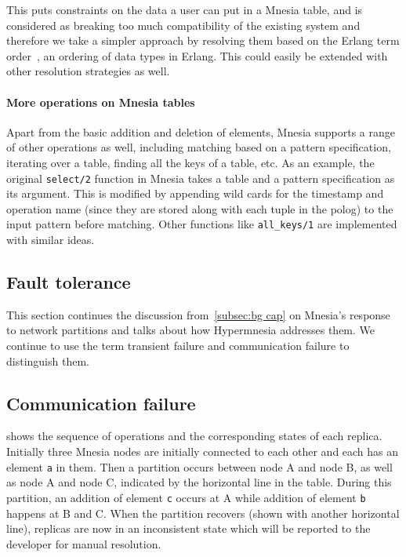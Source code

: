 This puts constraints on the data a user can put in a Mnesia table, and
is considered as breaking too much compatibility of the existing system and therefore
we take a simpler approach by resolving them based on the Erlang term 
order~\cite{ericssonab2023refmanual}, an ordering of data types in Erlang.
This could easily be extended with other resolution strategies as well.


\paragraph{More operations on Mnesia tables}

Apart from the basic addition and deletion of elements, Mnesia 
supports a range of other operations as well, including
matching based on a pattern specification, iterating over a table, finding all
the keys of a table, etc. As an example, the original \verb|select/2| function
in Mnesia takes a table and a pattern specification as its argument. This is
modified by appending wild cards for the timestamp and operation name (since they
are stored along with each tuple in the \acrshort{polog}) to the input pattern 
before matching. Other functions like \verb|all_keys/1| are implemented with
similar ideas.


\subsection{Fault tolerance} \label{subsec:impl fault tolerance}

This section continues the discussion from~\cref{subsec:bg cap} on Mnesia's response
to network partitions and talks about how Hypermnesia addresses them. We continue
to use the term transient failure and communication failure to distinguish them.

\subsection{Communication failure} \label{subsec:impl communication failure}

 shows the sequence of
operations and the corresponding states of each replica. Initially three
Mnesia nodes are initially connected to each other and each has an element
\texttt{a} in them. Then a partition occurs between node A and node B, as well as
node A and node C, indicated by the horizontal line in the table. 
During this partition, an addition of 
element \texttt{c} occurs at A while addition of element \texttt{b} happens
at B and C. When the partition recovers (shown with another horizontal line), replicas are 
now in an inconsistent state which will be reported to the developer for manual resolution.


